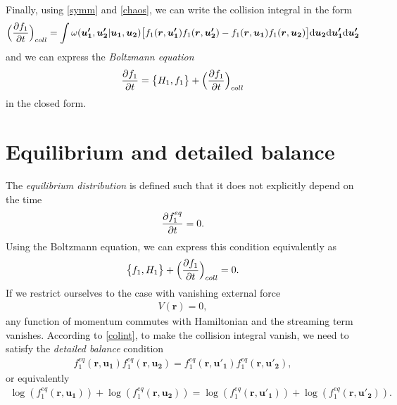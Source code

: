 Finally, using \ref{symm} and \ref{chaos}, we can write the collision integral in the form
\begin{align} \label{colint}
\Big( \frac{\partial f_1}{\partial t} \Big)_{coll}= \int \omega(\bm{u'_1},\bm{u'_2} | \bm{u_1}, \bm{u_2}) \big[f_1(\bm{r},\bm{u'_1})f_1(\bm{r},\bm{u'_2}) - f_1(\bm{r},\bm{u_1})f_1(\bm{r},\bm{u_2}) \big] \mathrm{d} \bm{u_2} \mathrm{d} \bm{u'_1} \mathrm{d} \bm{u'_2}
\end{align}
and we can express the \textit{Boltzmann equation}
\begin{align} \label{Boltz}
\frac{\partial f_1}{\partial t}  = \big\{ H_1, f_1 \big\} + \Big(\frac{\partial f_1}{\partial t} \Big)_{coll}
\end{align}
in the closed form.

\section{Equilibrium and detailed balance}
The \textit{equilibrium distribution} is defined such that it does not explicitly depend on the time
\begin{align*}
\frac{\partial f_1^{eq}}{\partial t} = 0.
\end{align*}
Using the Boltzmann equation, we can express this condition equivalently as
\begin{align*}
\big\{ f_1, H_1 \big\} + \Big( \frac{\partial f_1}{\partial t} \Big)_{coll} = 0.
\end{align*}
If we restrict ourselves to the case with vanishing external force
\begin{align*}
V(\bm{r}) = 0,
\end{align*}
any function of momentum commutes with Hamiltonian and the streaming term vanishes.
According to \ref{colint}, to make the collision integral vanish, we need to satisfy the \textit{detailed balance} condition
\begin{align} \label{detailedbalance}
f_1^{eq}(\bm{r},\bm{u_1})f_1^{eq}(\bm{r},\bm{u_2}) = f_1^{eq}(\bm{r},\bm{u'_1})f_1^{eq}(\bm{r},\bm{u'_2}),
\end{align}
or equivalently
\begin{align*}
\log(f_1^{eq}(\bm{r},\bm{u_1})) + \log(f_1^{eq}(\bm{r},\bm{u_2})) = \log(f_1^{eq}(\bm{r},\bm{u'_1})) + \log(f_1^{eq}(\bm{r},\bm{u'_2})).
\end{align*}

